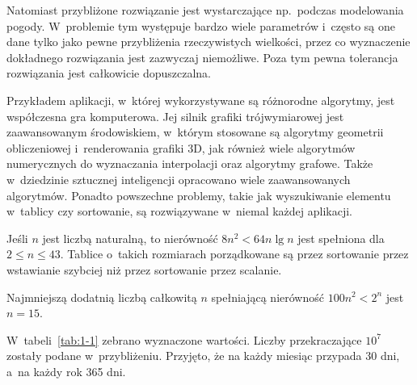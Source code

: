 Natomiast przybliżone rozwiązanie jest wystarczające np.\ podczas modelowania pogody. W~problemie tym występuje bardzo wiele parametrów i~często są one dane tylko jako pewne przybliżenia rzeczywistych wielkości, przez co wyznaczenie dokładnego rozwiązania jest zazwyczaj niemożliwe. Poza tym pewna tolerancja rozwiązania jest całkowicie dopuszczalna.


\exercise %
Przykładem aplikacji, w~której wykorzystywane są różnorodne algorytmy, jest współczesna gra komputerowa. Jej silnik grafiki trójwymiarowej jest zaawansowanym środowiskiem, w~którym stosowane są algorytmy geometrii obliczeniowej i~renderowania grafiki 3D, jak również wiele algorytmów numerycznych do wyznaczania interpolacji oraz algorytmy grafowe. Także w~dziedzinie sztucznej inteligencji opracowano wiele zaawansowanych algorytmów. Ponadto powszechne problemy, takie jak wyszukiwanie elementu w~tablicy czy sortowanie, są rozwiązywane w~niemal każdej aplikacji.

\exercise %
Jeśli $n$ jest liczbą naturalną, to nierówność $8n^2<64n\lg n$ jest spełniona dla $2\le n\le43$. Tablice o~takich rozmiarach porządkowane są przez sortowanie przez wstawianie szybciej niż przez sortowanie przez scalanie.

\exercise %
Najmniejszą dodatnią liczbą całkowitą $n$ spełniającą nierówność $100n^2<2^n$ jest $n=15$.

\problems

W~tabeli~\ref{tab:1-1} zebrano wyznaczone wartości. Liczby przekraczające $10^7$ zostały podane w~przybliżeniu. Przyjęto, że na każdy miesiąc przypada 30 dni, a~na każdy rok 365 dni.

